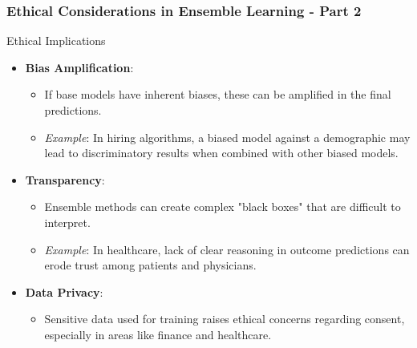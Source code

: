\documentclass[aspectratio=169]{beamer}
\begin{document}
\begin{frame}[fragile]
    \frametitle{Ethical Considerations in Ensemble Learning - Part 2}
    \begin{block}{Ethical Implications}
        \begin{itemize}
            \item \textbf{Bias Amplification}:
                \begin{itemize}
                    \item If base models have inherent biases, these can be amplified in the final predictions.
                    \item \textit{Example}: In hiring algorithms, a biased model against a demographic may lead to discriminatory results when combined with other biased models.
                \end{itemize}
                
            \item \textbf{Transparency}:
                \begin{itemize}
                    \item Ensemble methods can create complex "black boxes" that are difficult to interpret.
                    \item \textit{Example}: In healthcare, lack of clear reasoning in outcome predictions can erode trust among patients and physicians.
                \end{itemize}
                
            \item \textbf{Data Privacy}: 
                \begin{itemize}
                    \item Sensitive data used for training raises ethical concerns regarding consent, especially in areas like finance and healthcare.
                \end{itemize}
        \end{itemize}
    \end{block}
\end{frame}
\end{document}
